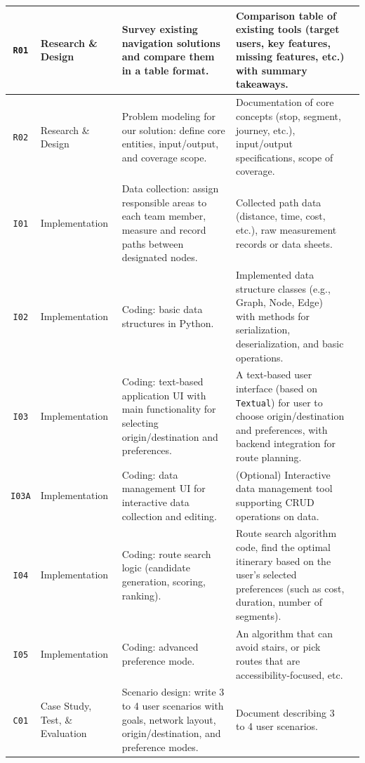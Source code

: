 \documentclass[a4paper,12pt]{amsart}
\begin{document}
\begin{landscape}
\begin{longtable}{c >{\raggedright\arraybackslash}m{4cm} >{\raggedright\arraybackslash}m{8cm} >{\raggedright\arraybackslash}m{8cm} >{\centering\arraybackslash}m{1.2cm}}
    \hypertarget{task:r01}{\texttt{R01}} & Research \& Design & Survey existing navigation solutions and compare them in a table format. & Comparison table of existing tools (target users, key features, missing features, etc.) with summary takeaways. & 3 \\
    \midrule[0.2pt]
    \hypertarget{task:r02}{\texttt{R02}} & Research \& Design & Problem modeling for our solution: define core entities, input/output, and coverage scope. & Documentation of core concepts (stop, segment, journey, etc.), input/output specifications, scope of coverage. & 1 \\
    \midrule[0.2pt]
    \hypertarget{task:i01}{\texttt{I01}} & Implementation & Data collection: assign responsible areas to each team member, measure and record paths between designated nodes. & Collected path data (distance, time, cost, etc.), raw measurement records or data sheets. & 7 \\
    \midrule[0.2pt]
    \hypertarget{task:i02}{\texttt{I02}} & Implementation & Coding: basic data structures in Python. & Implemented data structure classes (e.g., Graph, Node, Edge) with methods for serialization, deserialization, and basic operations. & 3 \\
    \midrule[0.2pt]
    \hypertarget{task:i03}{\texttt{I03}} & Implementation & Coding: text-based application UI with main functionality for selecting origin/destination and preferences. & A text-based user interface (based on \texttt{Textual}) for user to choose origin/destination and preferences, with backend integration for route planning. & 10 \\
    \midrule[0.2pt]
    \hypertarget{task:i03a}{\texttt{I03A}} & Implementation & Coding: data management UI for interactive data collection and editing. & (Optional) Interactive data management tool supporting CRUD operations on data. & 5 \\
    \midrule[0.2pt]
    \hypertarget{task:i04}{\texttt{I04}} & Implementation & Coding: route search logic (candidate generation, scoring, ranking). & Route search algorithm code, find the optimal itinerary based on the user's selected preferences (such as cost, duration, number of segments). & 5 \\
    \midrule[0.2pt]
    \hypertarget{task:i05}{\texttt{I05}} & Implementation & Coding: advanced preference mode. & An algorithm that can avoid stairs, or pick routes that are accessibility-focused, etc. & 3 \\
    \midrule[0.2pt]
    \hypertarget{task:c01}{\texttt{C01}} & Case Study, Test, \& Evaluation & Scenario design: write 3 to 4 user scenarios with goals, network layout, origin/destination, and preference modes. & Document describing 3 to 4 user scenarios. & 2 \\

\end{longtable}
\end{landscape}
\end{document}
